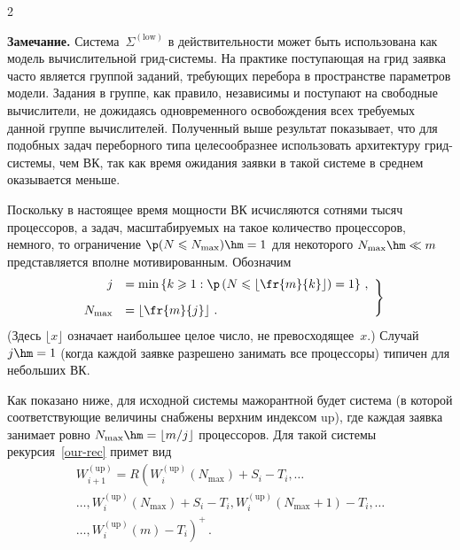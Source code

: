 \begin{multicols}{2}
\medskip

\noindent
\textbf{Замечание.}
Сис\-те\-ма~$\Sigma^{(\mathrm{low})}$ в действительности  может быть
использована как модель  вычислительной грид-сис\-те\-мы. На практике
поступающая  на грид заявка  часто является группой заданий,
требующих  перебора в пространстве параметров модели.
Задания в группе, как правило, независимы и поступают    на
свободные  вычислители, не дожидаясь одновременного освобождения
всех требуемых данной группе вычислителей. Полученный выше результат
показывает, что для подобных задач переборного типа целесообразнее
использовать архитектуру грид-сис\-те\-мы, чем ВК, так как время ожидания
заявки в такой системе в среднем оказывается меньше.

\smallskip

Поскольку в настоящее время  мощности ВК  исчисляются сотнями тысяч
процессоров, а  задач, масштабируемых на такое количество процессоров, немного, то
ограничение  $\p(N\leqslant N_{\max})\hm=1$ для некоторого $N_{\max}\hm\ll
m$ представляется вполне мотивированным. Обозначим
\begin{equation}
\left.
\begin{array}{rl}
    j&=\min\left\{ k\geqslant 1:
    \p\left(N\leqslant\left\lfloor\fr{m}{k}\right\rfloor\right)=1\right\}\,,\\[9pt]
    N_{\max}&=\left\lfloor\fr{m}{j}\right\rfloor\,.
    \end{array}
    \right\}
    \label{e8-mr}
\end{equation}
(Здесь $\lfloor x \rfloor$ означает наибольшее целое число, не превосходящее~$x$.)
Случай $j\hm=1$ (когда каждой заявке разрешено занимать все процессоры)
типичен для небольших ВК.

Как показано ниже, для исходной  системы мажорантной будет система
(в которой соответствующие величины снабжены  верхним индексом
up), где каждая заявка занимает ровно
$N_{\max}\hm=\lfloor{m}/{j}\rfloor$ процессоров. Для такой системы
рекурсия~\eqref{our-rec} примет вид
\begin{multline}
W^{(\mathrm{up})}_{i+1}= R\left(  W^{(\mathrm{up})}_{i}(N_{\max})+S_{i}-T_{i},\ldots\right.\\
\ldots ,W^{(\mathrm{up})}_{i}(N_{\max})+S_{i}-T_{i},
W^{(\mathrm{up})}_{i}(N_{\max}+1)-T_{i},\ldots\\
\left.\ldots,W^{(\mathrm{up})}_{i}(m)-T_{i}\right)^{+}\,.
\label{up-rec}
\end{multline}

\noindent


\end{multicols}
